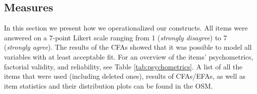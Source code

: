 \documentclass[man,floatsintext]{apa6}
\begin{document}
\hypertarget{measures}{%
\subsection{Measures}\label{measures}}

In this section we present how we operationalized our constructs. All items were answered on a 7-point Likert scale ranging from 1 (\emph{strongly disagree}) to 7 (\emph{strongly agree}). The results of the CFAs showed that it was possible to model all variables with at least acceptable fit. For an overview of the items' psychometrics, factorial validity, and reliability, see Table \ref{tab:psychometrics}. A list of all the items that were used (including deleted ones), results of CFAs/EFAs, as well as item statistics and their distribution plots can be found in the OSM.
\end{document}
